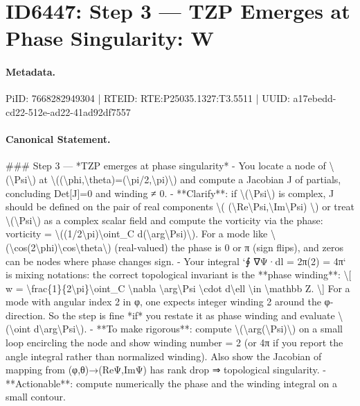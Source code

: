 \section*{ID6447: Step 3 — TZP Emerges at Phase Singularity: W}
\paragraph{Metadata.}
PiID: 7668282949304 | RTEID: RTE:P25035.1327:T3.5511 | UUID: a17ebedd-cd22-512e-ad22-41ad92df7557

\paragraph{Canonical Statement.}
\#\#\# Step 3 — *TZP emerges at phase singularity* - You locate a node of \textbackslash{}(\textbackslash{}Psi\textbackslash{}) at \textbackslash{}((\textbackslash{}phi,\textbackslash{}theta)=(\textbackslash{}pi/2,\textbackslash{}pi)\textbackslash{}) and compute a Jacobian J of partials, concluding Det[J]=0 and winding ≠ 0. - **Clarify**: if \textbackslash{}(\textbackslash{}Psi\textbackslash{}) is complex, J should be defined on the pair of real components \textbackslash{}( (\textbackslash{}Re\textbackslash{}Psi,\textbackslash{}Im\textbackslash{}Psi) \textbackslash{}) or treat \textbackslash{}(\textbackslash{}Psi\textbackslash{}) as a complex scalar field and compute the vorticity via the phase: vorticity = \textbackslash{}((1/2\textbackslash{}pi)\textbackslash{}oint\_C d(\textbackslash{}arg\textbackslash{}Psi)\textbackslash{}). For a mode like \textbackslash{}(\textbackslash{}cos(2\textbackslash{}phi)\textbackslash{}cos\textbackslash{}theta\textbackslash{}) (real-valued) the phase is 0 or π (sign flips), and zeros can be nodes where phase changes sign. - Your integral `∮ ∇Ψ·dl = 2π(2) = 4π` is mixing notations: the correct topological invariant is the **phase winding**: \textbackslash{}[ w = \textbackslash{}frac\{1\}\{2\textbackslash{}pi\}\textbackslash{}oint\_C \textbackslash{}nabla \textbackslash{}arg\textbackslash{}Psi \textbackslash{}cdot d\textbackslash{}ell \textbackslash{}in \textbackslash{}mathbb Z. \textbackslash{}] For a mode with angular index 2 in φ, one expects integer winding 2 around the φ-direction. So the step is fine *if* you restate it as phase winding and evaluate \textbackslash{}(\textbackslash{}oint d\textbackslash{}arg\textbackslash{}Psi\textbackslash{}). - **To make rigorous**: compute \textbackslash{}(\textbackslash{}arg(\textbackslash{}Psi)\textbackslash{}) on a small loop encircling the node and show winding number = 2 (or 4π if you report the angle integral rather than normalized winding). Also show the Jacobian of mapping from (φ,θ)→(ReΨ,ImΨ) has rank drop ⇒ topological singularity. - **Actionable**: compute numerically the phase and the winding integral on a small contour.

